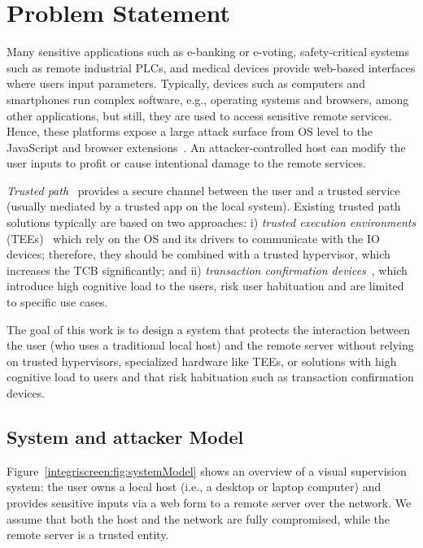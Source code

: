 \section{Problem Statement}
\label{sec:problemStatement_IS}

Many sensitive applications such as e-banking or e-voting, safety-critical systems such as remote industrial PLCs, and medical devices provide web-based interfaces where users input parameters. Typically, devices such as computers and smartphones run complex software, e.g., operating systems and browsers, among other applications, but still, they are used to access sensitive remote services. Hence, these platforms expose a large attack surface from OS level to the JavaScript and browser extensions~\cite{driveByDownload, extensionSecurity, extensionSecurity1, extensionHack1, microsoftPatches, kernelSecurity, linuxMalware, zeusMalware, wannacry}. An attacker-controlled host can modify the user inputs to profit or cause intentional damage to the remote services.

\emph{Trusted path}~\cite{zhou2012building} provides a secure channel between the user and a trusted service (usually mediated by a trusted app on the local system). Existing trusted path solutions typically are based on two approaches: i) \textit{trusted execution environments} (TEEs)~\cite{weiser2017sgxio} which rely on the OS and its drivers to communicate with the IO devices; therefore, they should be combined with a trusted hypervisor, which increases the TCB significantly; and ii) \textit{transaction confirmation devices}~\cite{filyanov2011uni}, which introduce high cognitive load to the users, risk user habituation and are limited to specific use cases.

The goal of this work is to design a system that protects the interaction between the user (who uses a traditional local host) and the remote server without relying on trusted hypervisors, specialized hardware like TEEs, or solutions with high cognitive load to users and that risk habituation such as transaction confirmation devices.

\subsection{System and attacker Model}
\label{sec:problemStatement:systemMode}

Figure~\ref{integriscreen:fig:systemModel} shows an overview of a visual supervision system: the user owns a local host (i.e., a desktop or laptop computer) and provides sensitive inputs via a web form to a remote server over the network. We assume that both the host and the network are fully compromised, while the remote server is a trusted entity. 

